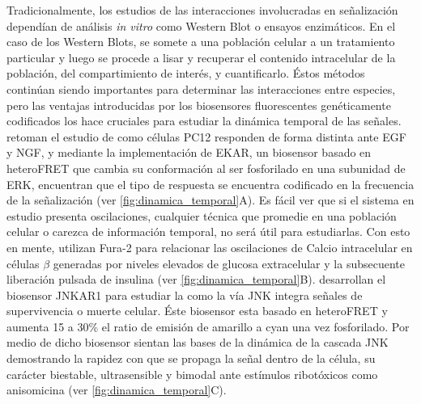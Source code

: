 Tradicionalmente, los estudios de las interacciones involucradas en señalización dependían de análisis \textit{in vitro} como Western Blot o ensayos enzimáticos. En el caso de los Western Blots, se somete a una población celular a un tratamiento particular y luego se procede a lisar y recuperar el contenido intracelular de la población, del compartimiento de interés, y cuantificarlo. Éstos métodos continúan siendo importantes para determinar las interacciones entre especies, pero las ventajas introducidas por los biosensores fluorescentes genéticamente codificados los hace cruciales para estudiar la dinámica temporal de las señales. \cite{Ryu2015} retoman el estudio de como células PC12 responden de forma distinta ante EGF y NGF, y mediante la implementación de EKAR, un biosensor basado en heteroFRET que cambia su conformación al ser fosforilado en una subunidad de ERK, encuentran que el tipo de respuesta se encuentra codificado en la frecuencia de la señalización (ver \cref{fig:dinamica_temporal}A). Es fácil ver que si el sistema en estudio presenta oscilaciones, cualquier técnica que promedie en una población celular o carezca de información temporal, no será útil para estudiarlas. Con esto en mente, \cite{Barbosa1998} utilizan Fura-2 para relacionar las oscilaciones de Calcio intracelular en células $\beta$ generadas por niveles elevados de glucosa extracelular y la subsecuente liberación pulsada de insulina (ver \cref{fig:dinamica_temporal}B). \cite{Fosbrink2010} desarrollan el biosensor JNKAR1 para estudiar la como la vía JNK integra señales de supervivencia o muerte celular. Éste biosensor esta basado en heteroFRET y aumenta 15 a 30\% el ratio de emisión de amarillo a cyan una vez fosforilado. Por medio de dicho biosensor sientan las bases de la dinámica de la cascada JNK demostrando la rapidez con que se propaga la señal dentro de la célula, su carácter biestable, ultrasensible y bimodal ante estímulos ribotóxicos como anisomicina (ver \cref{fig:dinamica_temporal}C).

